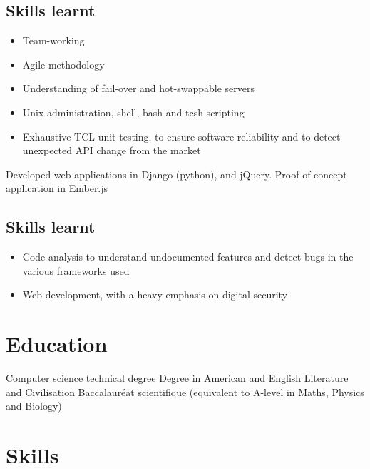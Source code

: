 \documentclass{cv}
\begin{document}
\subsection{Skills learnt}
\begin{itemize}
    \item {Team-working}
    \item {Agile methodology}
    \item {Understanding of fail-over and hot-swappable servers}
    \item {Unix administration, shell, bash and tcsh scripting}
    \item {Exhaustive TCL unit testing, to ensure software reliability and to detect unexpected API change from the market}
\end{itemize}

\pagebreak
{}
{Developed web applications in Django (python), and jQuery. Proof-of-concept application in Ember.js}
\subsection{Skills learnt}
\begin{itemize}
    \item {Code analysis to understand undocumented features and detect bugs in the various frameworks used}
    \item {Web development, with a heavy emphasis on digital security}
\end{itemize}

\section{Education}
{Computer science technical degree}
{Degree in American and English Literature and Civilisation}
{Baccalauréat scientifique (equivalent to A-level in Maths, Physics and Biology)}
 \section{Skills}
\end{document}
